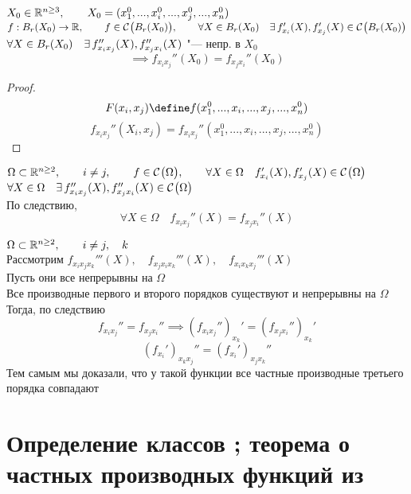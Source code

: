 \begin{implication}[для $ n > 2 $]
	$ X_0 \in \mathbb{R}^{n \ge 3}, \qquad X_0 = (x_1^0, ..., x_i^0, ..., x_j^0, ..., x_n^0) $ \\
	$ f : B_r(X_0) \to \mathbb{R}, \qquad f \in \mathcal{C}^{} \big( {B_r(X_0)} \big) , \qquad \forall X \in B_r(X_0) \quad \exists\, f_{x_i}'(X), f_{x_j}'(X) \in \mathcal{C}^{} \big( {B_r(X_0)} \big)  $ \\
	$ \forall X \in B_r(X_0) \quad \exists\, f_{x_ix_j}''(X), f_{x_jx_i}''(X) $ "--- непр. в $ X_0 $
	$$ \implies f_{x_ix_j}''(X_0) = f_{x_jx_i}''(X_0) $$
\end{implication}

\begin{proof}
	$$ F(x_i, x_j) \define f(x_1^0, ..., x_i, ..., x_j, ..., x_n^0) $$
	$$ f_{x_ix_j}''(X_i, x_j) = f_{x_ix_j}''(x_1^0, ..., x_i, ..., x_j, ..., x_n^0) $$
\end{proof}

\begin{statement}\label{stmt:mixed_der:1}
	$ \Omega \subset \mathbb{R}^{n \ge 2}, \qquad i \ne j, \qquad f \in \mathcal{C}^{} \big( {\Omega} \big) , \qquad \forall X \in \Omega \quad f_{x_i}'(X), f_{x_j}'(X) \in \mathcal{C}^{} \big( {\Omega} \big)  $ \\
	$ \forall X \in \Omega \quad \exists\, f_{x_ix_j}''(X), f_{x_jx_i}''(X) \in \mathcal{C}^{} \big( {\Omega} \big)  $ \\
	По следствию,
	$$ \forall X \in \Omega \quad f_{x_ix_j}''(X) = f_{x_jx_i}''(X) $$
\end{statement}

\begin{statement}
	$ \Omega \subset \mathbb{R}^{n \ge 2}, \qquad i \ne j, \quad k $ \\
	Рассмотрим $ f_{x_ix_jx_k}'''(X), \quad f_{x_jx_ix_k}'''(X), \quad f_{x_ix_kx_j}'''(X) $ \\
	Пусть они все непрерывны на $ \Omega $ \\
	Все производные первого и второго порядков существуют и непрерывны на $ \Omega $ \\
	Тогда, по следствию
	$$ f_{x_ix_j}'' = f_{x_jx_i}'' \implies (f_{x_ix_j}'')_{x_k}' = (f_{x_jx_i}'')_{x_k}' $$
	$$ (f_{x_i}')_{x_kx_j}'' = (f_{x_i}')_{x_jx_k}'' $$
	Тем самым мы доказали, что у такой функции все частные производные третьего порядка совпадают
\end{statement}

\section{Определение классов ; теорема о частных производных функций из }

